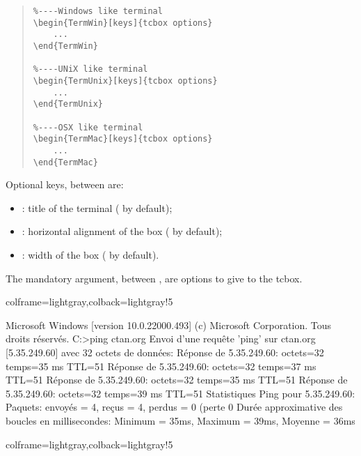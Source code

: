 \documentclass[11pt,a4paper]{ltxdoc}
\begin{document}
\begin{quote}
\begin{verbatim}
%----Windows like terminal
\begin{TermWin}[keys]{tcbox options}
    ...
\end{TermWin}

%----UNiX like terminal
\begin{TermUnix}[keys]{tcbox options}
    ...
\end{TermUnix}

%----OSX like terminal
\begin{TermMac}[keys]{tcbox options}
    ...
\end{TermMac}
\end{verbatim}
\end{quote}

Optional keys, between \MontreCode{[...]} are:

\begin{itemize}
	\item {}: title of the terminal ( by default);
	\item {}: horizontal alignment of the box ( by default);
	\item {}: width of the box ( by default).
\end{itemize}

\medskip

The mandatory argument, between , are options to give to the tcbox.

\begin{tcblisting}{colframe=lightgray,colback=lightgray!5}
\begin{TermWin}{}
Microsoft Windows [version 10.0.22000.493]
(c) Microsoft Corporation. Tous droits réservés.
C:\Users\test>ping ctan.org
Envoi d'une requête 'ping' sur ctan.org [5.35.249.60] avec 32 octets de données:
Réponse de 5.35.249.60: octets=32 temps=35 ms TTL=51
Réponse de 5.35.249.60: octets=32 temps=37 ms TTL=51
Réponse de 5.35.249.60: octets=32 temps=35 ms TTL=51
Réponse de 5.35.249.60: octets=32 temps=39 ms TTL=51
Statistiques Ping pour 5.35.249.60:
Paquets: envoyés = 4, reçus = 4, perdus = 0 (perte 0%
Durée approximative des boucles en millisecondes:
Minimum = 35ms, Maximum = 39ms, Moyenne = 36ms
\end{TermWin}
\end{tcblisting}

\begin{tcblisting}{colframe=lightgray,colback=lightgray!5}
\end{tcblisting}
\end{document}
